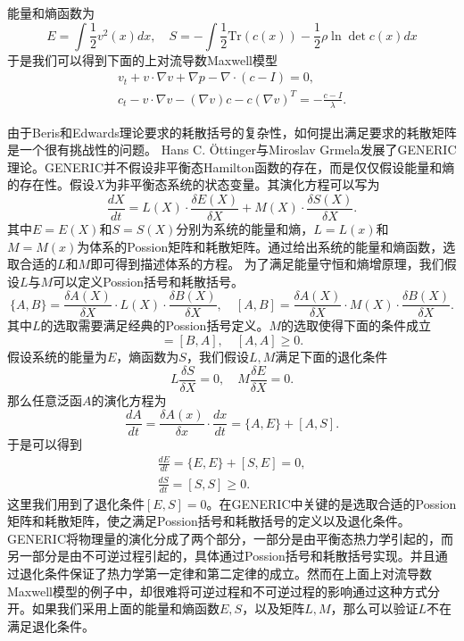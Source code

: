\documentclass{article}
\begin{document}
能量和熵函数为
\begin{equation*}
	E = \int \frac{1}{2} v^2(x)dx, \quad S = -\int \frac{1}{2} \mbox{
 	Tr}(c(x))- \frac{1}{2} \rho \ln \det c(x) dx
\end{equation*}
于是我们可以得到下面的上对流导数Maxwell模型
\begin{subequations}\label{eq:chap1UCMmaxll}
\begin{align}
	v_t + v \cdot \nabla v + \nabla p  - \nabla \cdot (c - I) = 0, \\
	c_t - v \cdot \nabla v - (\nabla v)c - c (\nabla v)^T = -\frac{c-I}{\lambda}.
\end{align}
\end{subequations}

由于Beris和Edwards理论要求的耗散括号的复杂性，如何提出满足要求的耗散矩阵是一个很有挑战性的问题。
 Hans C. \"Ottinger与Miroslav Grmela发展了GENERIC理论。GENERIC并不假设非平衡态Hamilton函数的存在，而是仅仅假设能量和熵的存在性。假设$X$为非平衡态系统的状态变量。其演化方程可以写为
\begin{equation*}
	\frac{dX}{dt} = L(X) \cdot \frac{\delta E(X)}{\delta X} + M(X) \cdot \frac{\delta S(X)}{\delta X} .
\end{equation*}
其中$E=E(X)$和$S=S(X)$分别为系统的能量和熵，$L=L(x)$和$M=M(x)$为体系的Possion矩阵和耗散矩阵。通过给出系统的能量和熵函数，选取合适的$L$和$M$即可得到描述体系的方程。 为了满足能量守恒和熵增原理，我们假设$L$与$M$可以定义Possion括号和耗散括号。
\begin{equation*}
	\{ A,B \} = \frac{\delta A(X)}{\delta X} \cdot L(X) \cdot \frac{\delta B(X)}{\delta X}, \quad  [ A,B ] = \frac{\delta A(X)}{\delta X} \cdot M(X) \cdot \frac{\delta B(X)}{\delta X}. 
\end{equation*}
其中$L$的选取需要满足经典的Possion括号定义。$M$的选取使得下面的条件成立
\begin{equation*}
	[A,B] = [B,A], \quad [A,A] \ge 0.
\end{equation*}
假设系统的能量为$E$，熵函数为$S$，我们假设$L,M$满足下面的退化条件
\begin{equation}
	L \frac{\delta S}{\delta X} = 0, \quad M \frac{\delta E}{\delta X} = 0.
\end{equation}
那么任意泛函$A$的演化方程为
 \begin{equation*}
	\frac{d A}{dt} = \frac{\delta A(x)}{\delta x} \cdot \frac{dx}{dt} = \{ A,E\} + [A,S].
\end{equation*}
于是可以得到
\begin{eqnarray*}
	\frac{d E}{dt} = \{E,E\} +[S,E] = 0, \\
	\frac{d S}{dt} = [S,S] \ge 0. 
\end{eqnarray*}
这里我们用到了退化条件$[E,S] = 0$。在GENERIC中关键的是选取合适的Possion矩阵和耗散矩阵，使之满足Possion括号和耗散括号的定义以及退化条件。GENERIC将物理量的演化分成了两个部分，一部分是由平衡态热力学引起的，而另一部分是由不可逆过程引起的，具体通过Possion括号和耗散括号实现。并且通过退化条件保证了热力学第一定律和第二定律的成立。然而在上面上对流导数Maxwell模型的例子中，却很难将可逆过程和不可逆过程的影响通过这种方式分开。如果我们采用上面的能量和熵函数$E,S$，以及矩阵$L,M$，那么可以验证$L$不在满足退化条件。  
\end{document}
